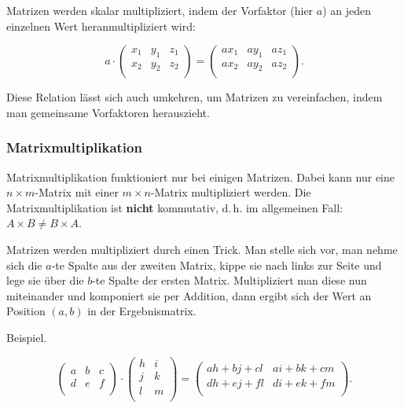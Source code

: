 \documentclass{scrartcl}
\begin{document}
Matrizen werden skalar multipliziert, indem der Vorfaktor (hier $a$) an jeden einzelnen Wert
heranmultipliziert wird:

\begin{equation}
	a \cdot \begin{pmatrix*}
		x_1 & y_1 & z_1\\
		x_2 & y_2 & z_2\\
	\end{pmatrix*} = \begin{pmatrix*}
		ax_1 & ay_1 & az_1\\
		ax_2 & ay_2 & az_2\\
	\end{pmatrix*}.
\end{equation}

Diese Relation lässt sich auch umkehren, um Matrizen zu vereinfachen, indem man gemeinsame Vorfaktoren herauszieht.

\subsubsection{Matrixmultiplikation}

Matrixmultiplikation funktioniert nur bei einigen Matrizen. Dabei kann nur eine $n\times m$-Matrix mit einer
$m\times n$-Matrix multipliziert werden. Die Matrixmultiplikation ist \textbf{nicht} kommutativ, d.\,h. im
allgemeinen Fall: $A \times B \not= B\times A$.

Matrizen werden multipliziert durch einen \frq Trick\flq. Man stelle sich vor, man nehme sich die $a$-te Spalte aus
der zweiten Matrix, kippe sie nach links zur Seite und lege sie über die $b$-te Spalte der ersten Matrix.
Multipliziert man diese nun miteinander und komponiert sie per Addition, dann ergibt sich der Wert an Position $(a, b)$
in der Ergebnismatrix.

Beispiel.

\begin{equation}
	\begin{pmatrix*}
		a & b & c\\
		d & e & f\\
	\end{pmatrix*} \cdot \begin{pmatrix*}
		h & i\\
		j & k\\
		l & m\\
	\end{pmatrix*} = \begin{pmatrix*}
		ah+bj+cl & ai+bk+cm\\
		dh+ej+fl & di+ek+fm\\
	\end{pmatrix*}.
\end{equation}
\end{document}
